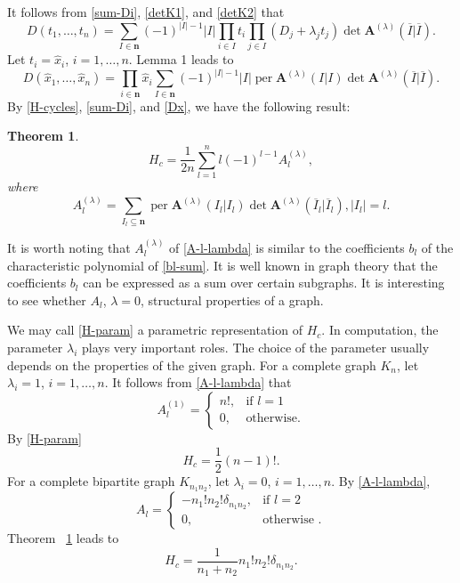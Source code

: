 \documentclass{article}
\newtheorem{thm}{Theorem}[section]
\theoremstyle{definition}
\theoremstyle{remark}
\DeclareMathOperator{\per}{per}
\newcommand{\envert}[1]{\left\lvert#1\right\rvert}
\let\abs=\envert
\begin{document}
It follows from \eqref{sum-Di}, \eqref{detK1}, and \eqref{detK2} that
\begin{equation}\label{Dt}
D(t_1,\dots,t_n)=\sum_{I\in\symbf{n}}(-1)^{\abs{I}-1}\abs{I}
\prod_{i\in I}t_i\prod_{j\in I}(D_j+\lambda_jt_j)\det\symbf{A}^{(\lambda)}
(\overline I|\overline I).
\end{equation}
Let $t_i=\hat x_i$, $i=1,\dots,n$. Lemma 1 leads to
\begin{equation}\label{Dx}
D(\hat x_1,\dots,\hat x_n)=\prod_{i\in\symbf{n}}\hat x_i
\sum_{I\in\symbf{n}}(-1)^{\abs{I}-1}\abs{I}\per \symbf{A}
^{(\lambda)}(I|I)\det\symbf{A}^{(\lambda)}(\overline I|\overline I).
\end{equation}
By \eqref{H-cycles}, \eqref{sum-Di}, and \eqref{Dx},
we have the following result:
\begin{thm}\label{thm-H-param}
\begin{equation}\label{H-param}
H_c=\frac{1}{2n}\sum^n_{l =1}l (-1)^{l -1}A_{l}
^{(\lambda)},
\end{equation}
where
\begin{equation}\label{A-l-lambda}
A^{(\lambda)}_l =\sum_{I_l \subseteq\symbf{n}}\per \symbf{A}
^{(\lambda)}(I_l |I_l )\det\symbf{A}^{(\lambda)}
(\overline I_{l}|\overline I_l ),\abs{I_{l}}=l .
\end{equation}
\end{thm}

It is worth noting that $A_l ^{(\lambda)}$ of \eqref{A-l-lambda} is
similar to the coefficients $b_l $ of the characteristic polynomial of
\eqref{bl-sum}. It is well known in graph theory that the coefficients
$b_l $ can be expressed as a sum over certain subgraphs. It is
interesting to see whether $A_l $, $\lambda=0$, structural properties
of a graph.

We may call \eqref{H-param} a parametric representation of $H_c$. In
computation, the parameter $\lambda_i$ plays very important roles. The
choice of the parameter usually depends on the properties of the given
graph. For a complete graph $K_n$, let $\lambda_i=1$, $i=1,\dots,n$.
It follows from \eqref{A-l-lambda} that
\begin{equation}\label{compl-gr}
A^{(1)}_l =\begin{cases} n!,&\text{if }l =1\\
0,&\text{otherwise}.\end{cases}
\end{equation}
By \eqref{H-param}
\begin{equation}
H_c=\frac 12(n-1)!.
\end{equation}
For a complete bipartite graph $K_{n_1n_2}$, let $\lambda_i=0$, $i=1,\dots,n$.
By \eqref{A-l-lambda},
\begin{equation}
A_l =
\begin{cases} -n_1!n_2!\delta_{n_1n_2},&\text{if }l =2\\
0,&\text{otherwise }.\end{cases}
\label{compl-bip-gr}
\end{equation}
Theorem ~\ref{thm-H-param}
leads to
\begin{equation}
H_c=\frac1{n_1+n_2}n_1!n_2!\delta_{n_1n_2}.
\end{equation}
\end{document}
